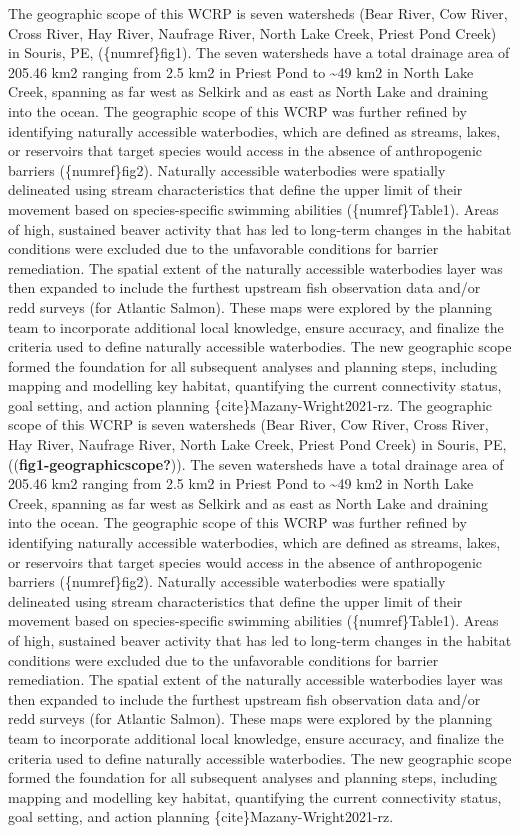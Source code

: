 \documentclass[
  letterpaper,
  DIV=11,
  numbers=noendperiod]{scrreprt}
\begin{document}
The geographic scope of this WCRP is seven watersheds (Bear River, Cow
River, Cross River, Hay River, Naufrage River, North Lake Creek, Priest
Pond Creek) in Souris, PE, (\{numref\}fig1). The seven watersheds have a
total drainage area of 205.46 km2 ranging from 2.5 km2 in Priest Pond to
\textasciitilde49 km2 in North Lake Creek, spanning as far west as
Selkirk and as east as North Lake and draining into the ocean. The
geographic scope of this WCRP was further refined by identifying
naturally accessible waterbodies, which are defined as streams, lakes,
or reservoirs that target species would access in the absence of
anthropogenic barriers (\{numref\}fig2). Naturally accessible
waterbodies were spatially delineated using stream characteristics that
define the upper limit of their movement based on species-specific
swimming abilities (\{numref\}Table1). Areas of high, sustained beaver
activity that has led to long-term changes in the habitat conditions
were excluded due to the unfavorable conditions for barrier remediation.
The spatial extent of the naturally accessible waterbodies layer was
then expanded to include the furthest upstream fish observation data
and/or redd surveys (for Atlantic Salmon). These maps were explored by
the planning team to incorporate additional local knowledge, ensure
accuracy, and finalize the criteria used to define naturally accessible
waterbodies. The new geographic scope formed the foundation for all
subsequent analyses and planning steps, including mapping and modelling
key habitat, quantifying the current connectivity status, goal setting,
and action planning \{cite\}Mazany-Wright2021-rz. The geographic scope
of this WCRP is seven watersheds (Bear River, Cow River, Cross River,
Hay River, Naufrage River, North Lake Creek, Priest Pond Creek) in
Souris, PE, ((\textbf{fig1-geographicscope?})). The seven watersheds
have a total drainage area of 205.46 km2 ranging from 2.5 km2 in Priest
Pond to \textasciitilde49 km2 in North Lake Creek, spanning as far west
as Selkirk and as east as North Lake and draining into the ocean. The
geographic scope of this WCRP was further refined by identifying
naturally accessible waterbodies, which are defined as streams, lakes,
or reservoirs that target species would access in the absence of
anthropogenic barriers (\{numref\}fig2). Naturally accessible
waterbodies were spatially delineated using stream characteristics that
define the upper limit of their movement based on species-specific
swimming abilities (\{numref\}Table1). Areas of high, sustained beaver
activity that has led to long-term changes in the habitat conditions
were excluded due to the unfavorable conditions for barrier remediation.
The spatial extent of the naturally accessible waterbodies layer was
then expanded to include the furthest upstream fish observation data
and/or redd surveys (for Atlantic Salmon). These maps were explored by
the planning team to incorporate additional local knowledge, ensure
accuracy, and finalize the criteria used to define naturally accessible
waterbodies. The new geographic scope formed the foundation for all
subsequent analyses and planning steps, including mapping and modelling
key habitat, quantifying the current connectivity status, goal setting,
and action planning \{cite\}Mazany-Wright2021-rz.
\end{document}
